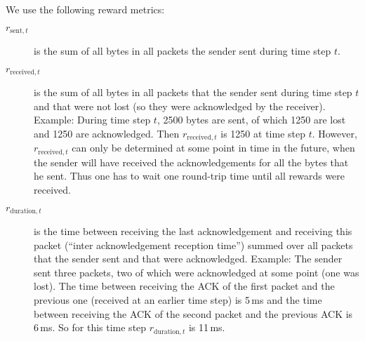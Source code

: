 \documentclass[newfonts=false,format=sigconf,10pt,letterpaper]{acmart}
\begin{document}
We use the following reward metrics: 
\begin{description}
\item[$\textit{r}_{\text{sent},t}$] is the sum of all bytes in all packets the sender sent during time step $t$. 
\item[$\textit{r}_{\text{received},t}$] is the sum of all bytes in all packets that the sender sent during time step $t$ and that were not lost (so they were acknowledged by the receiver). Example: During time step $t$, 2500 bytes are sent, of which 1250 are lost and 1250 are acknowledged. Then $\textit{r}_{\text{received},t}$ is 1250 at time step $t$. However, $\textit{r}_{\text{received},t}$ can only be determined at some point in time in the future, when the sender will have received the acknowledgements for all the bytes that he sent. Thus one has to wait one round-trip time until all rewards were received. 
\item[$\textit{r}_{\text{duration},t}$] is the time between receiving the last acknowledgement and receiving this packet (``inter acknowledgement reception time'') summed over all packets that the sender sent and that were acknowledged. Example: The sender sent three packets, two of which were acknowledged at some point (one was lost). The time between receiving the ACK of the first packet and the previous one (received at an earlier time step) is 5\,ms and the time between receiving the ACK of the second packet and the previous ACK is 6\,ms. So for this time step $\textit{r}_{\text{duration},t}$ is 11\,ms.
\end{description}

\end{document}

